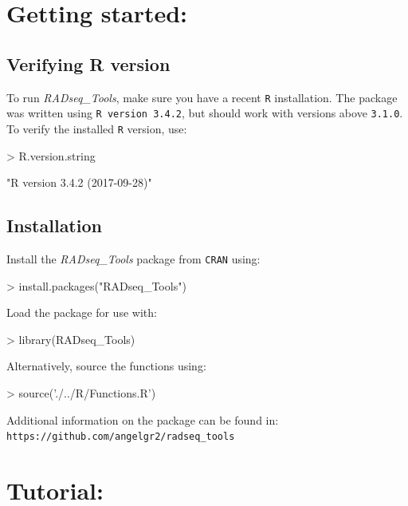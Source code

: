 \documentclass{article}
\begin{document}
\section{Getting started:}
\subsection{Verifying R version}
To run \emph{RADseq\_Tools}, make sure you have a recent \texttt{R} installation. The package was written using \texttt{R version 3.4.2}, but should work with versions above \texttt{3.1.0}. To verify the installed \texttt{R} version, use:
\begin{Schunk}
\begin{Sinput}
> R.version.string
\end{Sinput}
\begin{Soutput}
[1] "R version 3.4.2 (2017-09-28)"
\end{Soutput}
\end{Schunk}

\subsection{Installation}
Install the \emph{RADseq\_Tools} package from \texttt{CRAN} using:

\begin{Schunk}
\begin{Sinput}
> install.packages("RADseq_Tools")
\end{Sinput}
\end{Schunk}

Load the package for use with:
\begin{Schunk}
\begin{Sinput}
> library(RADseq_Tools)
\end{Sinput}
\end{Schunk}

Alternatively, source the functions using:
\begin{Schunk}
\begin{Sinput}
> source('./../R/Functions.R')
\end{Sinput}
\end{Schunk}

Additional information on the package can be found in:\\ \texttt{https://github.com/angelgr2/radseq\_tools}


\section{Tutorial:}
\end{document}
